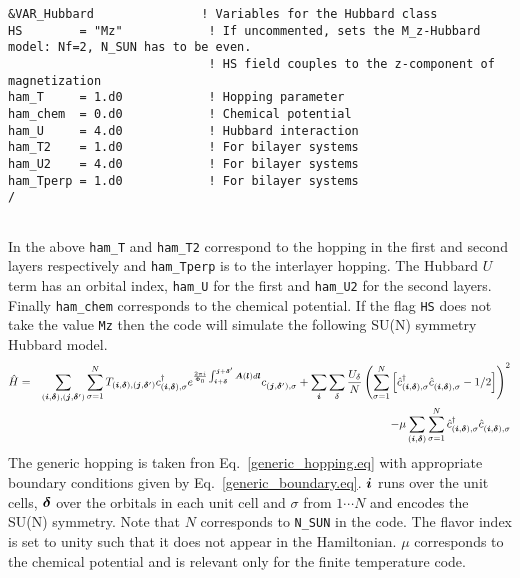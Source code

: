 \begin{lstlisting}[style=fortran,escapechar=\#,breaklines=true]
&VAR_Hubbard               ! Variables for the Hubbard class
HS        = "Mz"            ! If uncommented, sets the M_z-Hubbard model: Nf=2, N_SUN has to be even.  
                            ! HS field couples to the z-component of magnetization
ham_T     = 1.d0            ! Hopping parameter
ham_chem  = 0.d0            ! Chemical potential
ham_U     = 4.d0            ! Hubbard interaction
ham_T2    = 1.d0            ! For bilayer systems
ham_U2    = 4.d0            ! For bilayer systems
ham_Tperp = 1.d0            ! For bilayer systems
/
               
\end{lstlisting}
In the above   \texttt{ham\_T} and \texttt{ham\_T2}   correspond to the hopping in the first and second layers respectively and  \texttt{ham\_Tperp}   is to the interlayer hopping.   The Hubbard $U$ term has an orbital index, 
 \texttt{ham\_U}  for the first and  \texttt{ham\_U2}   for the second layers.  Finally   \texttt{ham\_chem}  corresponds to the chemical potential.     If  the flag \texttt{HS}  does not take the value \texttt{Mz}   then the code will simulate the  following 
SU(N)   symmetry Hubbard model. 
\begin{eqnarray}
\hat{H}= & & \sum_{(\ve{i},\ve{\delta}), (\ve{j},\ve{\delta}')}  \sum_{\sigma =1}^{N}  T_{(\ve{i},\ve{\delta}), (\ve{j},\ve{\delta}')}    c^{\dagger}_{(\ve{i},\ve{\delta}), \sigma }   e^{\frac{2 \pi i}{\Phi_0} \int_{\ve{i} + \ve{\delta}}^{\ve{j} + \ve{\delta}'}  
     \vec{A}(\ve{l})  d \ve{l}} c^{}_{(\ve{j},\ve{\delta}'),\sigma} 
+ \sum_{\vec{i}} \sum_{\delta}   \frac{U_\delta}{N} \left(\sum_{\sigma=1}^{N}  \left[   \hat{c}^{\dagger}_{(\vec{i},\ve{\delta}),\sigma } 
    \hat{c}^{\phantom\dagger}_{(\vec{i}, \ve{\delta}),\sigma }  - 1/2  \right] \right)^2  \nonumber \\
    & & - \mu \sum_{(\ve{i},\ve{\delta})}  \sum_{\sigma =1}^{N} \hat{c}^{\dagger}_{(\vec{i},\ve{\delta}),\sigma } \hat{c}^{\phantom\dagger}_{(\vec{i},\ve{\delta}),\sigma } 
\end{eqnarray}
The  generic hopping is taken fron Eq.~\ref{generic_hopping.eq}   with appropriate boundary conditions given by Eq.~\ref{generic_boundary.eq}.    $\boldsymbol{i}$ runs over the unit cells, $\boldsymbol{\delta}$ over the orbitals in each unit cell and $\sigma$  from $1 \cdots N$  and encodes  the SU(N) symmetry.    Note that  $N$ corresponds to \texttt{N\_SUN}  in the code.  The flavor index is set to  unity such that it does not appear in the  Hamiltonian.  $\mu$ corresponds to the chemical potential  and is relevant only for the finite temperature code. 

